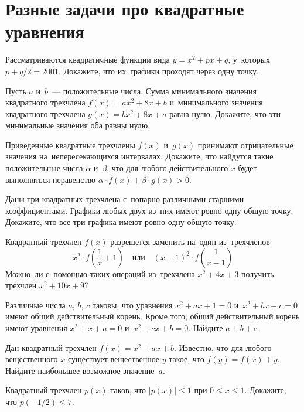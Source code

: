 
\section*{Разные задачи про квадратные уравнения}


\begingroup
    \def\abs#1{\lvert #1 \rvert}

\begin{problems}

\item
Рассматриваются квадратичные функции вида $y = x^2 + p x + q$, у~которых
$p + q / 2 = 2001$.
Докажите, что их~графики проходят через одну точку.

\item
Пусть $a$ и~$b$~--- положительные числа.
Сумма минимального значения квадратного трехчлена $f(x) = a x^2 + 8 x + b$
и~минимального значения квадратного трехчлена $g(x) = b x^2 + 8 x + a$ равна
нулю.
Докажите, что эти минимальные значения оба равны нулю.

\item
Приведенные квадратные трехчлены $f(x)$ и~$g(x)$ принимают отрицательные
значения на~непересекающихся интервалах.
Докажите, что найдутся такие положительные числа $\alpha$ и~$\beta$, что для
любого действительного $x$ будет выполняться неравенство
$\alpha \cdot f(x) + \beta \cdot g(x) > 0$.

\item
Даны три квадратных трехчлена с~попарно различными старшими коэффициентами.
Графики любых двух из~них имеют ровно одну общую точку.
Докажите, что все три графика имеют ровно одну общую точку.

\item
Квадратный трехчлен $f(x)$ разрешется заменить на~один из~трехчленов
\[
    x^2 \cdot f\left(\frac{1}{x} + 1 \right)
\quad\text{или}\quad
    (x - 1)^2 \cdot f\left(\frac{1}{x - 1} \right)
\]
Можно~ли с~помощью таких операций из~трехчлена $x^2 + 4 x + 3$ получить
трехчлен $x^2 + 10 x + 9$? 

\item
Различные числа $a$, $b$, $c$ таковы, что уравнения $x^2 + a x + 1 = 0$
и~$x^2 + b x + c = 0$ имеют общий действительный корень.
Кроме того, общий действительный корень имеют уравнения $x^2 + x + a = 0$
и~$x^2 + c x + b = 0$.
Найдите $a + b + c$.

\item
Дан квадратный трехчлен $f(x) = x^2 + a x + b$.
Известно, что для любого вещественного $x$ существует вещественное $y$ такое,
что $f(y) = f(x) + y$.
Найдите наибольшее возможное значение~$a$.

\item
Квадратный трехчлен $p(x)$ таков, что $\abs{p(x)} \leq 1$ при $0 \leq x \leq 1$.
Докажите, что $p(- 1 / 2) \leq 7$.

\end{problems}

\endgroup %

